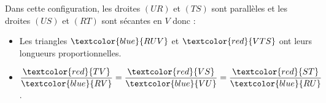 \begin{corrige}
\begin{multicols}
\begin{enumerate}
            Dans cette configuration, les droites $(UR)$ et $(TS)$ sont parallèles et les droites $(US)$ et $(RT)$
            sont sécantes en $V$ donc :            

            \begin{itemize}
                \item Les triangles $\textcolor{blue}{RUV}$ et $\textcolor{red}{VTS}$ ont leurs longueurs proportionnelles.
                
                \item $\dfrac{\textcolor{red}{TV}}{\textcolor{blue}{RV}}=\dfrac{\textcolor{red}{VS}}{\textcolor{blue}{VU}}=\dfrac{\textcolor{red}{ST}}{\textcolor{blue}{RU}}$.
            \end{itemize}  
        \end{enumerate}
    \end{multicols}
\end{corrige}

